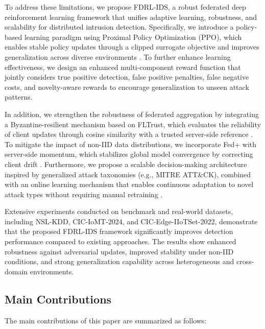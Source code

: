 \documentclass[conference]{IEEEtran}
\begin{document}
To address these limitations, we propose FDRL-IDS, a robust federated deep reinforcement learning framework that unifies adaptive learning, robustness, and scalability for distributed intrusion detection. Specifically, we introduce a policy-based learning paradigm using Proximal Policy Optimization (PPO), which enables stable policy updates through a clipped surrogate objective and improves generalization across diverse environments \cite{ppo}. To further enhance learning effectiveness, we design an enhanced multi-component reward function that jointly considers true positive detection, false positive penalties, false negative costs, and novelty-aware rewards to encourage generalization to unseen attack patterns.

In addition, we strengthen the robustness of federated aggregation by integrating a Byzantine-resilient mechanism based on FLTrust, which evaluates the reliability of client updates through cosine similarity with a trusted server-side reference \cite{fltrust}. To mitigate the impact of non-IID data distributions, we incorporate Fed+ with server-side momentum, which stabilizes global model convergence by correcting client drift \cite{fedplus}. Furthermore, we propose a scalable decision-making architecture inspired by generalized attack taxonomies (e.g., MITRE ATT\&CK), combined with an online learning mechanism that enables continuous adaptation to novel attack types without requiring manual retraining \cite{mitre}.

Extensive experiments conducted on benchmark and real-world datasets, including NSL-KDD, CIC-IoMT-2024, and CIC-Edge-IIoTSet-2022, demonstrate that the proposed FDRL-IDS framework significantly improves detection performance compared to existing approaches. The results show enhanced robustness against adversarial updates, improved stability under non-IID conditions, and strong generalization capability across heterogeneous and cross-domain environments.

\subsection*{Main Contributions}

The main contributions of this paper are summarized as follows:
\end{document}
